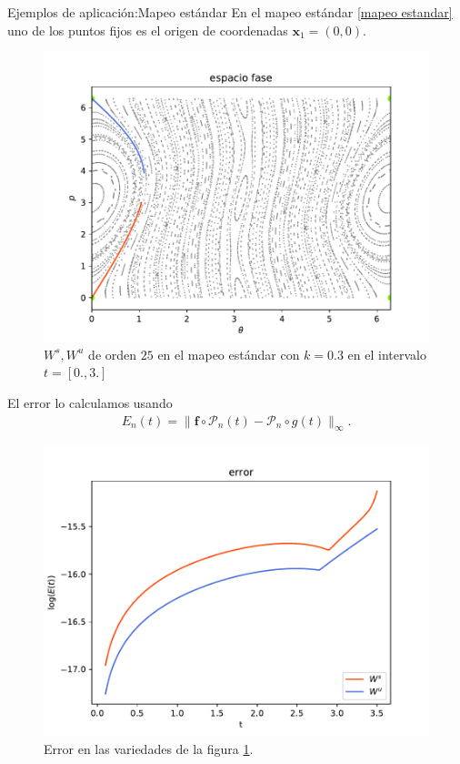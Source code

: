 \documentclass[11pt]{beamer}
\theoremstyle{definition}
\begin{document}
\begin{frame}{Ejemplos de aplicaci\'on:Mapeo est\'andar}
En el mapeo estándar \eqref{mapeo estandar} uno de los puntos fijos es el origen de coordenadas $\mathbf{x}_{1}=(0,0)$.
\begin{figure}[H]
\centering
\includegraphics[scale=0.4]{k03}
\caption{\footnotesize $W^{s},W^{u}$ de orden $25$ en el mapeo estándar con $k=0.3$ en el intervalo $t=[0.,3.]$}
\label{estandar03}
\end{figure}
\end{frame}
\begin{frame}
El error lo calculamos usando 
\begin{eqnarray*}
E_{n}(t) = \parallel \mathbf{f} \circ \mathcal{P}_{n}(t) - \mathcal{P}_{n} \circ g(t) \parallel_{\infty}.
\end{eqnarray*}
\begin{figure}[H]
\centering
\includegraphics[scale=0.5]{errork03} 
\caption{Error en las variedades de la figura \ref{estandar03}.}
\label{error est k03}
\end{figure}
\end{frame}
\end{document}
